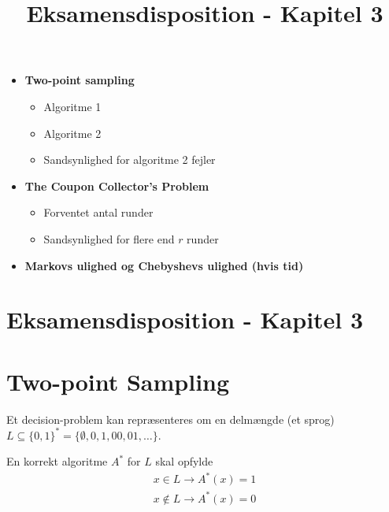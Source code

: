 
\title{Eksamensdisposition - Kapitel 3}


\maketitle

\begin{itemize}
  \item \textbf{Two-point sampling}
  \begin{itemize}
    \item Algoritme 1
    \item Algoritme 2
    \item Sandsynlighed for algoritme 2 fejler
  \end{itemize}
  \item \textbf{The Coupon Collector's Problem}
  \begin{itemize}
    \item Forventet antal runder
    \item Sandsynlighed for flere end $r$ runder
  \end{itemize}
  \item \textbf{Markovs ulighed og Chebyshevs ulighed (hvis tid)}
\end{itemize}


\newpage
\section{Eksamensdisposition - Kapitel 3}

\section{Two-point Sampling}
Et decision-problem kan repræsenteres om en delmængde (et sprog) $L \subseteq \{0, 1\}^\ast = \{\emptyset, 0, 1, 00, 01, \dots \}$.

En korrekt algoritme $A^\ast$ for $L$ skal opfylde
\begin{align*}
  x \in L \rightarrow A^\ast(x) = 1\\
  x \notin L \rightarrow A^\ast(x) = 0
\end{align*}


